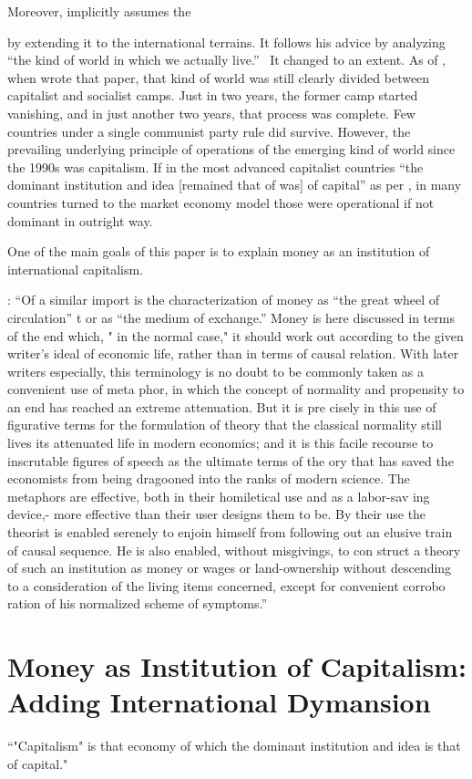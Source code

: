 Moreover, implicitly \cite{dillard1987} assumes the 

by extending it to the international terrains. It follows his advice by analyzing ``the kind of world in which we actually live.''~\citep[p.~1623]{dillard1987} It changed to an extent. As of \citeyear{dillard1987}, when \citeauthor{dillard1987} wrote that paper, that kind of world was still clearly divided between capitalist and socialist camps. Just in two years, the former camp started vanishing, and in just another two years, that process was complete. Few countries under a single communist party rule did survive. However, the prevailing underlying principle of operations of the emerging kind of world since the 1990s was capitalism. If in the most advanced capitalist countries ``the dominant institution and idea [remained that of was] of capital'' as per \citep[p.~40]{ayres1944}, in many countries turned to the market economy model those were operational if not dominant in outright way. 

\citep{rudd2024}

One of the main goals of this paper is to explain money as an institution of international capitalism.

\citep[pp.~382-383]{veblen1898}: ``Of a
 similar import is the characterization of money as ``the
 great wheel of circulation'' t or as ``the medium of exchange.''  Money is here discussed in terms of the end
 which, " in the normal case," it should work out according
 to the given writer's ideal of economic life, rather than in
 terms of causal relation.
 With later writers especially, this terminology is no
 doubt to be commonly taken as a convenient use of meta
 phor, in which the concept of normality and propensity to
 an end has reached an extreme attenuation. But it is pre
 cisely in this use of figurative terms for the formulation of
 theory that the classical normality still lives its attenuated
 life in modern economics; and it is this facile recourse to
 inscrutable figures of speech as the ultimate terms of the
 ory that has saved the economists from being dragooned
 into the ranks of modern science. The metaphors are
 effective, both in their homiletical use and as a labor-sav
 ing device,- more effective than their user designs them
 to be. By their use the theorist is enabled serenely to
 enjoin himself from following out an elusive train of causal
 sequence. He is also enabled, without misgivings, to con
 struct a theory of such an institution as money or wages or
 land-ownership without descending to a consideration of
 the living items concerned, except for convenient corrobo
 ration of his normalized scheme of symptoms.''


\section{Money as Institution of Capitalism: Adding International Dymansion}

``"Capitalism" is that economy of which the dominant institution and idea is that of capital." \citep[p.~40]{ayres1944}
